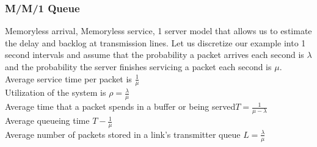 \subsubsection*{M/M/1 Queue}
Memoryless arrival, Memoryless service, 1 server model that allows us to estimate the delay and backlog at transmission lines. Let us discretize our example into 1 second intervals and assume that the probability a packet arrives each second is $\lambda$ and the probability the server finishes servicing a packet each second is $\mu$. \\
Average service time per packet is $\frac{1}{\mu}$ \\
Utilization of the system is $\rho = \frac{\lambda}{\mu}$ \\
Average time that a packet spends in a buffer or being served$T = \frac{1}{\mu-\lambda}$ \\ 
Average queueing time $T-\frac{1}{\mu}$\\
Average number of packets  stored in a link's transmitter queue $L = \frac{\lambda}{\mu}$